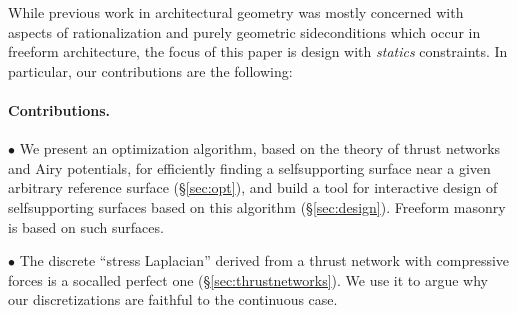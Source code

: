 \documentclass[annual]{acmsiggraph}
\newcommand{\secref}[1]{(\S\ref{#1})}
\begin{document}
While previous work in architectural geometry was mostly concerned
with aspects of rationalization and purely geometric side\dash conditions
which occur in freeform architecture, the focus of this paper is design with
{\em statics} constraints. In particular, our
contributions are the following:




\paragraph{Contributions.}


$\bullet$ We present an optimization algorithm, based on the theory of
thrust networks and Airy potentials, for efficiently finding a
self\dash supporting surface near a given arbitrary reference surface
\secref{sec:opt}, and build a tool for interactive design of
self\dash supporting surfaces based on this algorithm \secref{sec:design}.
Freeform masonry is based on such surfaces.

$\bullet$ The discrete ``stress Laplacian''
derived from a thrust network with compressive
forces is a so\dash called perfect one \secref{sec:thrustnetworks}.
We use it to argue why our discretizations are 
faithful to the continuous case.
\end{document}
